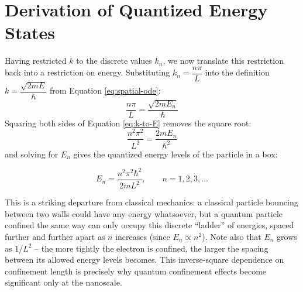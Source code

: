 \documentclass[12pt, a4paper]{article}
\begin{document}
\section{Derivation of Quantized Energy States}
Having restricted $k$ to the discrete values $k_n$, we now translate
this restriction back into a restriction on energy. Substituting
$k_n = \dfrac{n\pi}{L}$ into the definition $k = \dfrac{\sqrt{2mE}}{\hbar}$
from Equation \eqref{eq:spatial-ode}:
\begin{equation}
    \frac{n\pi}{L} = \frac{\sqrt{2mE_n}}{\hbar}
    \label{eq:k-to-E}
\end{equation}
Squaring both sides of Equation \eqref{eq:k-to-E} removes the square
root:
\begin{equation}
    \frac{n^2\pi^2}{L^2} = \frac{2mE_n}{\hbar^2}
\end{equation}
and solving for $E_n$ gives the quantized energy levels of the
particle in a box:
\begin{resultbox}
\begin{equation}
    E_n = \frac{n^2 \pi^2 \hbar^2}{2mL^2}, \qquad n = 1, 2, 3, \dots
    \label{eq:energy}
\end{equation}
\end{resultbox}
This is a striking departure from classical mechanics: a classical
particle bouncing between two walls could have any energy whatsoever,
but a quantum particle confined the same way can only occupy this
discrete ``ladder'' of energies, spaced further and further apart as
$n$ increases (since $E_n \propto n^2$). Note also that $E_n$ grows as
$1/L^2$ -- the more tightly the electron is confined, the larger the
spacing between its allowed energy levels becomes. This inverse-square
dependence on confinement length is precisely why quantum confinement
effects become significant only at the nanoscale.
\end{document}
